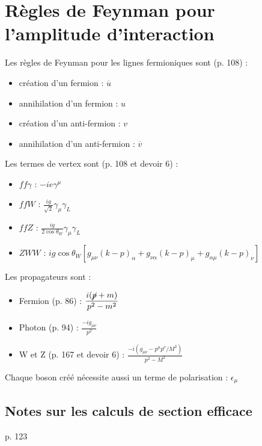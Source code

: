 \documentclass[12pt]{article}
\begin{document}
\section{Règles de Feynman pour l'amplitude d'interaction}

\hfill \break
Les règles de Feynman pour les lignes fermioniques sont (p. 108) : 

\begin{itemize}
  \item création d'un fermion : $\overline{u}$
  \item annihilation d'un fermion : $u$
  \item création d'un anti-fermion : $v$
  \item annihilation d'un anti-fermion : $\overline{v}$
\end{itemize}

\hfill \break
Les termes de vertex sont (p. 108 et devoir 6) :

\begin{itemize}
  \item $ff\gamma$ : $-ie\gamma^\mu$
  \item $ffW$ : $\displaystyle \frac{ig}{\sqrt{2}} \gamma_\mu \gamma_L$
  \item $ffZ$ : $\displaystyle \frac{ig}{2 \cos{\theta}_W} \gamma_\mu \gamma_L$
  \item $ZWW$ : $ig\cos{\theta}_W [ g_{\mu\nu}(k-p)_\alpha +  g_{\nu\alpha}(k-p)_\mu +  g_{\alpha\mu}(k-p)_\nu]$
\end{itemize} 

\hfill \break
Les propagateurs sont :

\begin{itemize}
  \item Fermion (p. 86) : $\displaystyle \frac{i(\cancel{p} + m)}{p^2 - m^2}$ 
  \item Photon (p. 94) : $\displaystyle \frac{-i g_{\mu\nu}}{p^2}$
  \item W et Z (p. 167 et devoir 6) : $\displaystyle \frac{-i(g_{\mu\nu} - p^\mu p^\nu/M^2)}{p^2-M^2}$
\end{itemize}

\hfill \break
Chaque boson créé nécessite aussi un terme de polarisation : $\epsilon_\mu$

\subsection{Notes sur les calculs de section efficace}

p. 123 
\end{document}
